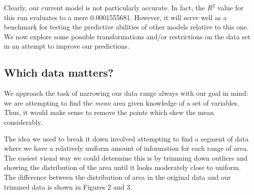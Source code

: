 \documentclass{article}
\begin{document}
Clearly, our current model is not particularly accurate. In fact, the $R^2$
value for this run evaluates to a mere 0.0001555681. However, it will serve
well as a benchmark for testing the predictive abilities of other models
relative to this one. We now explore some possible transformations and/or
restrictions on the data set in an attempt to improve our predictions.

\subsection{Which data matters?}

We approach the task of narrowing our data range always with our goal in mind:
we are attempting to find the \emph{mean} area given knowledge of a set of
variables. Thus, it would make sense to remove the points which skew the mean
considerably.

The idea we used to break it down involved attempting to find a segment of data
where we have a relatively uniform amount of information for each range of
area. The easiest visual way we could determine this is by trimming down
outliers and showing the distribution of the area until it looks moderately
close to uniform. The difference between the distribution of area in the
original data and our trimmed data is shown in Figures 2 and 3.
\end{document}
